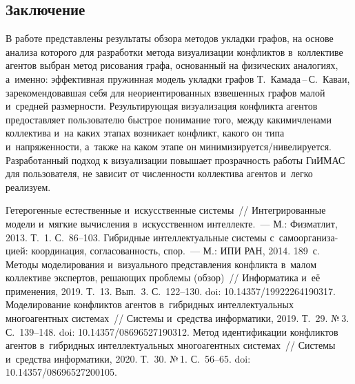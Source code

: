 \begin{multicols}{2}
\vspace*{-11pt}

\section{Заключение}

\vspace*{-4pt}

  В работе представлены результаты обзора методов укладки графов, на 
основе анализа которого для разработки метода визуализации конфликтов 
в~коллективе агентов выбран метод рисования графа, основанный на 
физических аналогиях, а~именно: эффективная пружинная модель укладки 
графов Т.~Ка\-ма\-да\,--\,С.~Ка\-ваи, зарекомендовавшая себя для 
неориентированных взвешенных графов малой и~средней размерности. 
Результирующая визуализация конфликта агентов предоставляет пользо\-вателю 
быстрое понимание того, между какими\linebreak членами коллектива и~на каких этапах 
возникает конфликт, какого он типа и~напряженности, а~также на каком этапе 
он минимизируется/нивелируется. Разработанный подход к визуализации 
повышает прозрачность работы \mbox{ГиИМАС} для пользователя, не 
зависит от численности коллектива агентов и~легко реализуем.
  
\vspace*{-11pt}

{\small\frenchspacing
    {\baselineskip=10.4pt
    \begin{thebibliography}{99}

\vspace*{-2pt}

 Гетерогенные естественные и~искусственные системы~// 
Интегрированные модели и~мягкие вычисления в~искусственном интеллекте.~--- 
М.: Физматлит, 2013. Т.~1. С.~86--103.
    Гиб\-рид\-ные интеллектуальные 
системы с~самоорганиза- цией: координация, согласованность, спор.~--- М.: ИПИ РАН, 2014. 
189~с.
 Методы моделирования и~визуального 
представления конфликта в~малом коллективе экспертов, решающих проблемы (обзор)~// 
Информатика и~её применения, 2019. Т.~13. Вып.~3. С.~122--130. doi: 
10.14357/19922264190317.
 Моделирование конфликтов агентов в~гибридных 
интеллектуальных многоагентных системах~// Системы и~средства информатики, 2019. 
Т.~29. №\,3. С.~139--148. doi: 10.14357/08696527190312.
 Метод идентификации конфликтов агентов 
в~гибридных интеллектуальных многоагентных системах~// Сис\-те\-мы и~средства 
информатики, 2020. Т.~30. №\,1. С.~56--65. doi: 10.14357/08696527200105.


\end{thebibliography}}}
\end{multicols}
